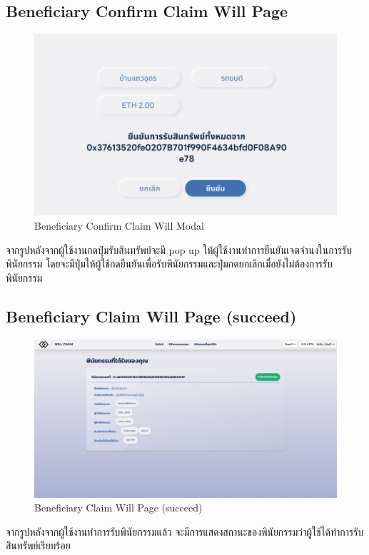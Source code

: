 \documentclass[12pt,oneside,openright,a4paper]{cpe-thai-project}
\begin{document}
\subsection{Beneficiary Confirm Claim Will Page}
	\begin{figure}[!thb]
			\centering
			\includegraphics[scale=0.3]{claimWillConfirm4}
			\caption{Beneficiary Confirm Claim Will Modal }
		\end{figure}
		\FloatBarrier
\tab จากรูปหลังจากผู้ใช้งานกดปุ่มรับสินทรัพย์จะมี pop up ให้ผู้ใช้งานทำการยืนยันเจตจำนงในการรับพินัยกรรม โดยจะมีปุ่มให้ผู้ใช้กดยืนยันเพื่อรับพินัยกรรมและปุ่มกดยกเลิกเมื่อยังไม่ต้องการรับพินัยกรรม

\subsection{Beneficiary Claim Will Page (succeed) }
	\begin{figure}[!thb]
			\centering
			\includegraphics[scale=0.2]{claimWillSuc4}
			\caption{Beneficiary Claim Will Page (succeed)}
		\end{figure}
		\FloatBarrier
\tab จากรูปหลังจากผู้ใช้งานทำการรับพินัยกรรมแล้ว จะมีการแสดงสถานะของพินัยกรรมว่าผู้ใช้ได้ทำการรับสินทรัพย์เรียบร้อย
\end{document}
